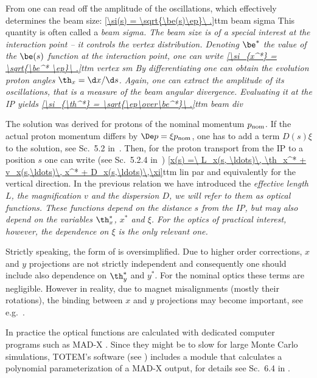 From  one can read off the amplitude of the oscillations, which effectively determines the beam size:
\eqref{\si(s) = \sqrt{\be(s)\ep}\ .}{ttm beam sigma}
This quantity is often called a \em{beam sigma}. The beam size is of a special interest at the interaction point -- it controls the vertex distribution. Denoting $\be^*$ the value of the $\be(s)$ function at the interaction point, one can write
\eqref{\si_{x^*} = \sqrt{\be^* \ep}\ .}{ttm vertex sm}
By differentiating  one can obtain the evolution proton angles $\th_x = \d x/\d s$. Again, one can extract the amplitude of its oscillations, that is a measure of the beam angular divergence. Evaluating it at the IP yields
\eqref{\si_{\th^*} = \sqrt{\ep\over\be^*}\ .}{ttm beam div}

The solution  was derived for protons of the nominal momentum $p_{\rm nom}$. If the actual proton momentum differs by $\De p = \xi p_{\rm nom}$, one has to add a term $D(s) \xi$ to the solution, see Sc.~5.2 in~. Then, for the proton transport from the IP to a position $s$ one can write (see Sc.~5.2.4 in~)
\eqref{x(s) =\ L_x(s, \ldots)\, \th_x^* + v_x(s,\ldots)\, x^* + D_x(s,\ldots)\,\xi}{ttm lin par}
and equivalently for the vertical direction. In the previous relation we have introduced the \em{effective length} $L$, the \em{magnification} $v$ and the \em{dispersion} $D$, we will refer to them as \em{optical functions}. These functions depend on the distance $s$ from the IP, but may also depend on the variables $\th_x^*$, $x^*$ and $\xi$. For the optics of practical interest, however, the dependence on $\xi$ is the only relevant one.

Strictly speaking, the form of  is oversimplified. Due to higher order corrections, $x$ and $y$ projections are not strictly independent and consequently one should include also dependence on $\th_y^*$ and $y^*$. For the nominal optics these terms are negligible. However in reality, due to magnet misalignments (mostly their rotations), the binding between $x$ and $y$ projections may become important, see e.g.~.

In practice the optical functions are calculated with dedicated computer programs such as MAD-X . Since they might be to slow for large Monte Carlo simulations, TOTEM's software (see ) includes a module that calculates a polynomial parameterization of a MAD-X output, for details see Sc.~6.4 in .

